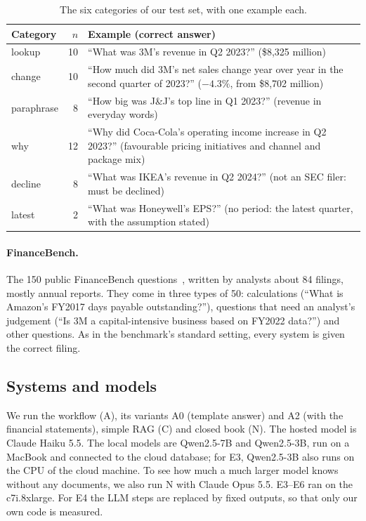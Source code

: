 \begin{table}[ht]
\centering\small
\begin{tabularx}{\linewidth}{lrX}
\toprule
Category & $n$ & Example (correct answer) \\
\midrule
lookup     & 10 & ``What was 3M's revenue in Q2 2023?'' (\$8,325 million) \\
change     & 10 & ``How much did 3M's net sales change year over year in the second quarter of 2023?''
                  ($-4.3\%$, from \$8,702 million) \\
paraphrase & 8  & ``How big was J\&J's top line in Q1 2023?'' (revenue in everyday words) \\
why        & 12 & ``Why did Coca-Cola's operating income increase in Q2 2023?'' (favourable pricing
                  initiatives and channel and package mix) \\
decline    & 8  & ``What was IKEA's revenue in Q2 2024?'' (not an SEC filer: must be declined) \\
latest     & 2  & ``What was Honeywell's EPS?'' (no period: the latest quarter, with the assumption stated) \\
\bottomrule
\end{tabularx}
\caption{The six categories of our test set, with one example each.}
\label{tab:question-examples}
\end{table}

\paragraph{FinanceBench.} The 150 public FinanceBench questions~\cite{financebench}, written by
analysts about 84 filings, mostly annual reports. They come in three types of 50: calculations (``What
is Amazon's FY2017 days payable outstanding?''), questions that need an analyst's judgement (``Is 3M a
capital-intensive business based on FY2022 data?'') and other questions. As in the benchmark's
standard setting, every system is given the correct filing.

\subsection{Systems and models}

We run the workflow (A), its variants A0 (template answer) and A2 (with the financial statements),
simple RAG (C) and closed book (N). The hosted model is Claude Haiku 5.5. The local models are
Qwen2.5-7B and Qwen2.5-3B, run on a MacBook and connected to the cloud database; for E3, Qwen2.5-3B
also runs on the CPU of the cloud machine. To see how much a much larger model knows without any
documents, we also run N with Claude Opus 5.5. E3--E6 ran on the c7i.8xlarge. For E4 the LLM steps
are replaced by fixed outputs, so that only our own code is measured.

